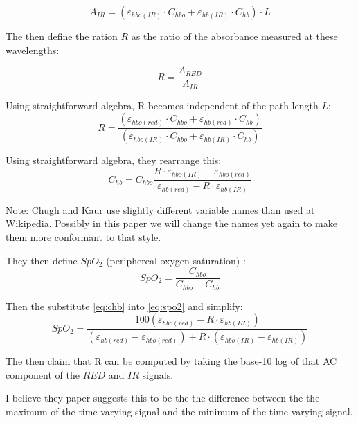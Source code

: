 \documentclass[11pt]{article}
\begin{document}
\begin{equation}
  A_{IR} = (\varepsilon_{hbo(IR)}\cdot C_{hbo} + \varepsilon_{hb(IR)}\cdot C_{hb}) \cdot L
\end{equation}

The then define the ration $R$ as the ratio of the absorbance measured
at these wavelengths:

\begin{equation}
  R = \frac{A_{RED}}{A_{IR}}
  \end{equation}

Using straightforward algebra, R becomes independent of the path length $L$:
\begin{equation}
  R = \frac{(\varepsilon_{hbo(red)}\cdot C_{hbo} + \varepsilon_{hb(red)}\cdot C_{hb})}{(\varepsilon_{hbo(IR)}\cdot C_{hbo} + \varepsilon_{hb(IR)}\cdot C_{hb})}
\end{equation}

Using straightforward algebra, they rearrange this:
\begin{equation}
  \label{eq:chb}
  C_{hb} = C_{hbo} \frac{R \cdot \varepsilon_{hbo(IR)} - \varepsilon_{hbo(red)}}
  {\varepsilon_{hb(red)} - R \cdot \varepsilon_{hb(IR)} }
\end{equation}

Note: Chugh and Kaur use slightly different variable names than used at Wikipedia.
Possibly in this paper we will change the names yet again to make them more
conformant to that style.

They then define $SpO_2$ (periphereal oxygen saturation)
\cite{wiki:SpO2,wiki:oxygensaturation}:
\begin{equation}
  \label{eq:spo2}
  SpO_2 = \frac{C_{hbo}}{C_{hbo} + C_{hb}}
\end{equation}

Then the substitute \ref{eq:chb} into \ref{eq:spo2} and simplify:
\begin{equation}
  SpO_2 = \frac{100 (\varepsilon_{hbo(red)} - R \cdot \varepsilon_{hb(IR)})}
  {(\varepsilon_{hb(red)} - \varepsilon_{hbo(red)}) + R \cdot(\varepsilon_{hbo(IR)} - \varepsilon_{hb(IR)})}
\end{equation}

The then claim that R can be computed by taking the base-10 log of that AC 
component of the $RED$ and $IR$ signals.

I believe they paper suggests this to be the the difference between the the maximum
of the time-varying signal and the minimum of the time-varying signal.
\end{document}
